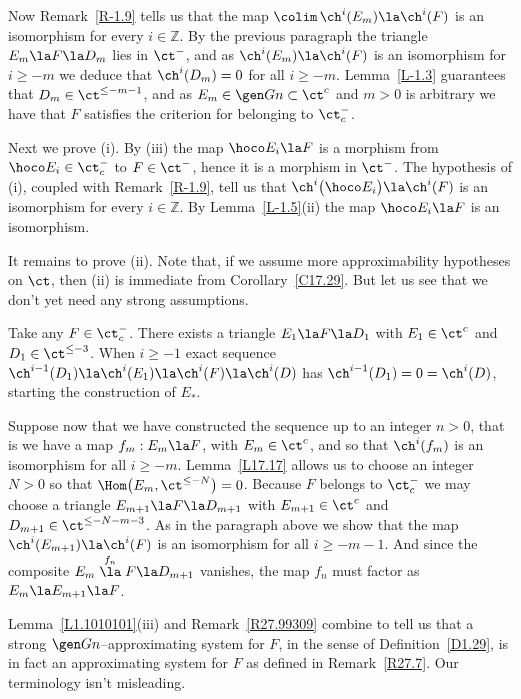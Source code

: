 \documentclass[11pt]{amsart}
\newcommand{\zz}{{\mathbb Z}}
\begin{document}
Now Remark~\ref{R-1.9} tells us that the map $\colim\,\ch^i(E_m)\la\ch^i(F)$
is an isomorphism for every $i\in\zz$. By the previous paragraph
the triangle
$E_m\la F\la D_m$ lies in $\ct^-$, and
as $\ch^i(E_m)\la\ch^i(F)$ is an isomorphism for $i\geq-m$
we deduce that $\ch^i(D_m)=0$ for all $i\geq-m$.
Lemma~\ref{L-1.3} guarantees that $D_m\in\ct^{\leq-m-1}$, and as
$E_m\in\gen Gn\subset\ct^c$ and $m>0$ is arbitrary
we have that $F$ satisfies the criterion for belonging to $\ct^-_c$.

Next we prove (i). By (iii) the map $\hoco E_i\la F$ is a morphism from
$\hoco E_i\in\ct^-_c$ to $F\in\ct^-$, hence it is a morphism
in $\ct^-$. The hypothesis of (i), coupled with Remark~\ref{R-1.9},
tell us that $\ch^i\big(\hoco E_i\big)\la \ch^i(F)$ is an isomorphism
for every $i\in\zz$. By Lemma~\ref{L-1.5}(ii) the map
$\hoco E_i\la F$ is an isomorphism.

It remains to prove (ii). Note that, if we assume more approximability
hypotheses on $\ct$, then (ii) is immediate from Corollary~\ref{C17.29}.
But let us see that we don't yet need any strong assumptions.

Take any $F\in\ct^-_c$. There exists a triangle $E_1\la F\la D_1$ with
$E_1\in\ct^c$ and $D_1\in\ct^{\leq-3}$. When $i\geq-1$ exact sequence
$\ch^{i-1}(D_1)\la\ch^i(E_1)\la\ch^i(F)\la\ch^i(D)$ has
$\ch^{i-1}(D_1)=0=\ch^i(D)$, starting the construction of $E_*$.

Suppose now that we have constructed the sequence up to an integer
$n>0$, that is we have a map $f_m:E_m\la F$, with $E_m\in\ct^c$, and so
that $\ch^i(f_m)$ is an isomorphism for all $i\geq-m$. Lemma~\ref{L17.17}
allows us to choose an integer $N>0$ so that
$\Hom\big(E_m,\ct^{\leq-N}\big)=0$. Because $F$ belongs to $\ct^-_c$ we may
choose a triangle $E_{m+1}\la F\la D_{m+1}$ with $E_{m+1}\in\ct^c$
and $D_{m+1}\in\ct^{\leq-N-m-3}$. As in the paragraph above we
show that the map $\ch^i(E_{m+1})\la\ch^i(F)$ is an isomorphism for all
$i\geq-m-1$. And since the composite $E_m\stackrel{f_n}\la F\la D_{m+1}$
vanishes, the map $f_n$ must factor as $E_m\la E_{m+1}\la F$.
\eprf

Lemma~\ref{L1.1010101}(iii) and Remark~\ref{R27.99309} combine to tell
us that a strong $\gen Gn$--approximating system for $F$,
in the sense of Definition~\ref{D1.29},
is in fact an approximating system for $F$
as defined in Remark~\ref{R27.7}. Our terminology isn't misleading.
\ermk
\end{document}
